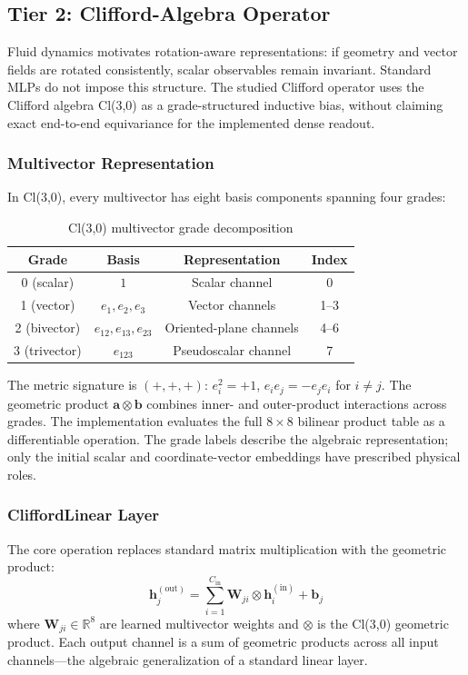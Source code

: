 \documentclass[journal]{IEEEtran}
\newcommand{\added}[1]{#1}
\begin{document}
\subsection{\added{Tier 2: Clifford-Algebra Operator}}
\label{sec:clifford}

Fluid dynamics motivates rotation-aware representations: if geometry and vector fields are rotated consistently, scalar observables remain invariant. Standard MLPs do not impose this structure. The studied Clifford operator \cite{brandstetter2023clifford} uses the Clifford algebra Cl(3,0) as a \added{grade-structured inductive bias, without claiming exact end-to-end equivariance for the implemented dense readout}.

\subsubsection{Multivector Representation}
In Cl(3,0), every multivector has eight basis components spanning four grades:

\begin{table}[htbp]
\caption{Cl(3,0) multivector grade decomposition}
\label{tab:grades}
\centering
\begin{tabular}{cccc}
\toprule
\textbf{Grade} & \textbf{Basis} & \textbf{Representation} & \textbf{Index} \\
\midrule
0 (scalar) & $1$ & Scalar channel & 0 \\
1 (vector) & $e_1, e_2, e_3$ & Vector channels & 1--3 \\
2 (bivector) & $e_{12}, e_{13}, e_{23}$ & Oriented-plane channels & 4--6 \\
3 (trivector) & $e_{123}$ & Pseudoscalar channel & 7 \\
\bottomrule
\end{tabular}
\end{table}

The metric signature is $(+,+,+)$: $e_i^2 = +1$, $e_i e_j = -e_j e_i$ for $i \neq j$. The geometric product $\bm{a} \otimes \bm{b}$ combines inner- and outer-product interactions across grades. The implementation evaluates the full $8 \times 8$ bilinear product table as a differentiable operation. The grade labels describe the algebraic representation; only the initial scalar and coordinate-vector embeddings have prescribed physical roles.

\subsubsection{CliffordLinear Layer}
The core operation replaces standard matrix multiplication with the geometric product:
\begin{equation}
\bm{h}_j^{(\text{out})} = \sum_{i=1}^{C_\text{in}} \bm{W}_{ji} \otimes \bm{h}_i^{(\text{in})} + \bm{b}_j
\label{eq:clifford_linear}
\end{equation}
where $\bm{W}_{ji} \in \mathbb{R}^8$ are learned multivector weights and $\otimes$ is the Cl(3,0) geometric product. Each output channel is a sum of geometric products across all input channels---the algebraic generalization of a standard linear layer.
\end{document}
